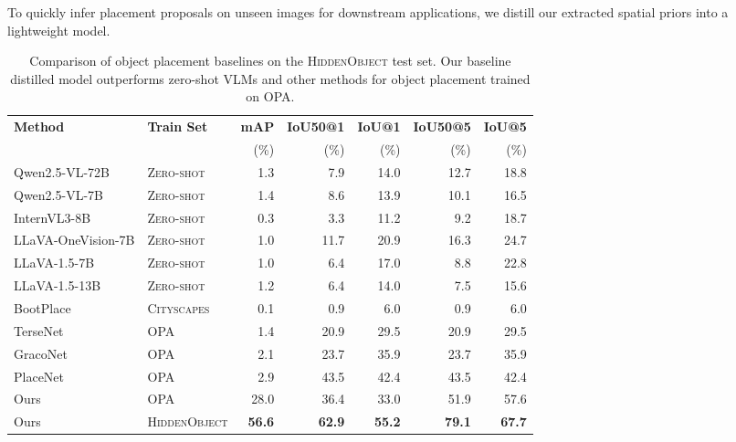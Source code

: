 To quickly infer placement proposals on unseen images for downstream applications, we distill our extracted spatial priors into a lightweight model.

\begin{table}[t]
\centering
\caption{Comparison of object placement baselines on the \textsc{HiddenObject} test set. Our baseline distilled model outperforms zero-shot VLMs and other methods for object placement trained on OPA.}
\label{tab:baseline_comparison}
\begin{tabular}{llrrrrr}
\toprule
\textbf{Method} & \textbf{Train Set} & \textbf{mAP} & \textbf{IoU50@1} & \textbf{IoU@1} & \textbf{IoU50@5} & \textbf{IoU@5} \\
 & & (\%) & (\%) & (\%) & (\%) & (\%) \\
\midrule
Qwen2.5-VL-72B     & \textsc{Zero-shot} & 1.3  & 7.9  & 14.0 & 12.7 & 18.8 \\
Qwen2.5-VL-7B      & \textsc{Zero-shot} & 1.4  & 8.6  & 13.9 & 10.1 & 16.5 \\
InternVL3-8B       & \textsc{Zero-shot} & 0.3  & 3.3  & 11.2 & 9.2  & 18.7 \\
LLaVA-OneVision-7B & \textsc{Zero-shot} & 1.0  & 11.7 & 20.9 & 16.3 & 24.7 \\
LLaVA-1.5-7B       & \textsc{Zero-shot} & 1.0  & 6.4  & 17.0 & 8.8  & 22.8 \\
LLaVA-1.5-13B      & \textsc{Zero-shot} & 1.2  & 6.4  & 14.0 & 7.5  & 15.6 \\
\midrule
BootPlace~\cite{zhou2025bootplace}    & \textsc{Cityscapes}           & 0.1  & 0.9  & 6.0  & 0.9  & 6.0  \\
TerseNet~\cite{tripathi2019learning}  &   \textsc{OPA}        & 1.4  & 20.9 & 29.5 & 20.9 & 29.5 \\
GracoNet~\cite{zhou2022learning}      &  \textsc{OPA}        & 2.1  & 23.7 & 35.9 & 23.7 & 35.9 \\
PlaceNet~\cite{zhang2020learning}     &   \textsc{OPA}        & 2.9  & 43.5 & 42.4 & 43.5 & 42.4 \\
Ours                                  & \textsc{OPA}       & 28.0 & 36.4 & 33.0 & 51.9 & 57.6 \\
\rowcolor{gray!15}
Ours                                  & \textsc{HiddenObject} & \textbf{56.6} & \textbf{62.9} & \textbf{55.2} & \textbf{79.1} & \textbf{67.7} \\
\bottomrule
\end{tabular}
\end{table}


